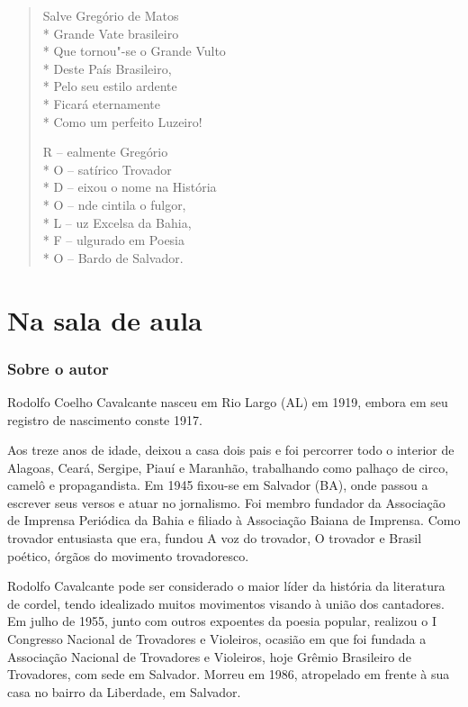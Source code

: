\begin{verse}
Salve Gregório de Matos\\*
Grande Vate brasileiro\\*
Que tornou"-se o Grande Vulto\\*
Deste País Brasileiro,\\*
Pelo seu estilo ardente\\*
Ficará eternamente\\*
Como um perfeito Luzeiro!

R -- ealmente Gregório\\*
O -- satírico Trovador\\*
D -- eixou o nome na História\\*
O -- nde cintila o fulgor,\\*
L -- uz Excelsa da Bahia,\\*
F -- ulgurado em Poesia\\*
O -- Bardo de Salvador.

\end{verse}

\part{Na sala de aula}

\pagebreak
\section{Sobre o autor}

Rodolfo Coelho Cavalcante nasceu em Rio Largo (AL) em 1919, embora em
seu registro de nascimento conste 1917. 

Aos treze anos de idade, deixou a casa dois pais e foi percorrer todo o
interior de Alagoas, Ceará, Sergipe, Piauí e Maranhão, trabalhando como
palhaço de circo, camelô e propagandista. Em 1945 fixou-se em Salvador
(BA), onde passou a escrever seus versos e atuar no jornalismo. Foi
membro fundador da Associação de Imprensa Periódica da Bahia e filiado
à Associação Baiana de Imprensa. Como trovador entusiasta que era,
fundou A voz do trovador, O trovador e Brasil poético, órgãos do
movimento trovadoresco.

Rodolfo Cavalcante pode ser considerado o maior líder da história da
literatura de cordel, tendo idealizado muitos movimentos visando à
união dos cantadores. Em julho de 1955, junto com outros expoentes da
poesia popular, realizou o I Congresso Nacional de Trovadores e
Violeiros, ocasião em que foi fundada a Associação Nacional de
Trovadores e Violeiros, hoje Grêmio Brasileiro de Trovadores, com sede
em Salvador. Morreu em 1986, atropelado em frente à sua casa no bairro
da Liberdade, em Salvador.

